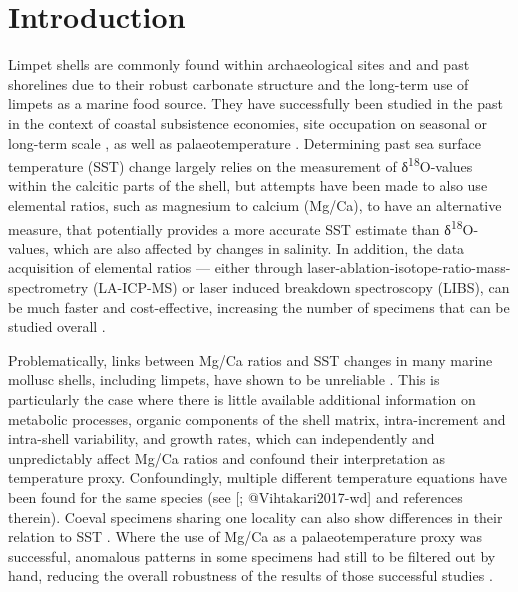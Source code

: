 \documentclass[
  authoryear,
  preprint,
  3p]{elsarticle}
\begin{document}
\section{Introduction}\label{Introduction}

Limpet shells are commonly found within archaeological sites and and
past shorelines due to their robust carbonate structure and the
long-term use of limpets as a marine food source. They have successfully
been studied in the past in the context of coastal subsistence
economies, site occupation on seasonal
\citep{Shackleton1973-ij, Parker2018-wf, Bosch2018-ud} or long-term
scale \citep{Ortiz2015-mr}, as well as palaeotemperature
\citep{Fenger2007-gf, Surge2012-ba, Wang2012-ee, Colonese2012-ct, Ferguson2011-zl}.
Determining past sea surface temperature (SST) change largely relies on
the measurement of δ\textsuperscript{18}O-values within the calcitic
parts of the shell, but attempts have been made to also use elemental
ratios, such as magnesium to calcium (Mg/Ca), to have an alternative
measure, that potentially provides a more accurate SST estimate than
δ\textsuperscript{18}O-values, which are also affected by changes in
salinity. In addition, the data acquisition of elemental ratios ---
either through laser-ablation-isotope-ratio-mass-spectrometry
(LA-ICP-MS) or laser induced breakdown spectroscopy (LIBS), can be much
faster and cost-effective, increasing the number of specimens that can
be studied overall \citep{Durham2017-fh, Hausmann2023-ih}.

Problematically, links between Mg/Ca ratios and SST changes in many
marine mollusc shells, including limpets, have shown to be unreliable
\citep{Surge2008-ri, Wanamaker2008-zl, Schone2010-yl, Freitas2012-tx, Graniero2015-zv, Poulain2015-dg, Vihtakari2017-wd}.
This is particularly the case where there is little available additional
information on metabolic processes, organic components of the shell
matrix, intra-increment and intra-shell variability, and growth rates,
which can independently and unpredictably affect Mg/Ca ratios and
confound their interpretation as temperature proxy. Confoundingly,
multiple different temperature equations have been found for the same
species (see {[}\citet{Freitas2012-tx}; @Vihtakari2017-wd{]} and
references therein). Coeval specimens sharing one locality can also show
differences in their relation to SST \citep{Hausmann2019-fi}. Where the
use of Mg/Ca as a palaeotemperature proxy was successful, anomalous
patterns in some specimens had still to be filtered out by hand,
reducing the overall robustness of the results of those successful
studies \citep{Ferguson2011-zl}.
\end{document}
